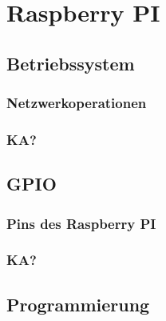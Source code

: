 \chapter{Raspberry PI}
	\section{Betriebssystem}
		\subsection{Netzwerkoperationen}
		\subsection{KA?} %
	\section{GPIO}
		\subsection{Pins des Raspberry PI}
		\subsection{KA?} %
	\section{Programmierung}